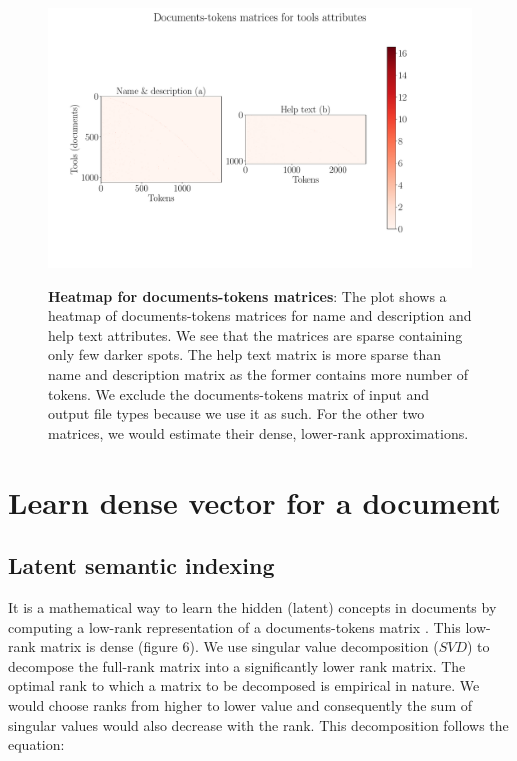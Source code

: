 \begin{figure}[h]
\begin{centering}
    {\includegraphics[scale=0.4]{figures/Document_tokens_full_rank.pdf}}
    \caption[Heatmap for documents-tokens matrices]{\textbf{Heatmap for documents-tokens matrices}: The plot shows a heatmap of documents-tokens matrices for name and description and help text attributes. We see that the matrices are sparse containing only few darker spots. The help text matrix is more sparse than name and description matrix as the former contains more number of tokens. We exclude the documents-tokens matrix of input and output file types because we use it as such. For the other two matrices, we would estimate their dense, lower-rank approximations.}
\end{centering}
\end{figure}

    
\section{Learn dense vector for a document}
\subsection{Latent semantic indexing}
    It is a mathematical way to learn the hidden (latent) concepts in documents by computing a low-rank representation of a documents-tokens matrix \cite{Foltz1996, Shapiro2000, Landauer1998}. This low-rank matrix is dense (figure 6). We use singular value decomposition ($SVD$) to decompose the full-rank matrix into a significantly lower rank matrix. The optimal rank to which a matrix to be decomposed is empirical in nature. We would choose ranks from higher to lower value and consequently the sum of singular values would also decrease with the rank. This decomposition follows the equation:
    
